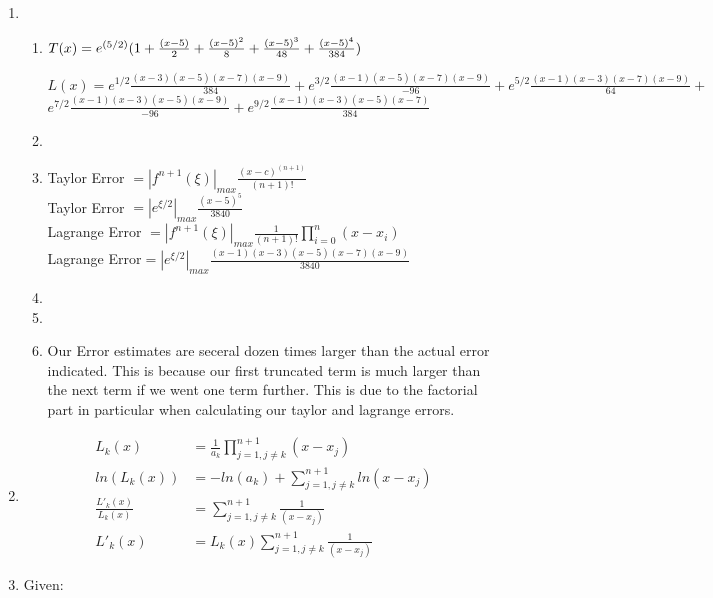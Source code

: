 \documentclass{article}
\begin{document}

\begin{enumerate}

\item \begin{enumerate}
\item 
$
T(x)=e^{(5/2)}(1+\frac{(x-5)}{2}+\frac{(x-5)^2}{8}+\frac{(x-5)^3}{48}+\frac{(x-5)^4}{384}) \\
$


$ L(x)=e^{1/2}\frac{(x-3)(x-5)(x-7)(x-9)}{384}+ e^{3/2}\frac{(x-1)(x-5)(x-7)(x-9)}{-96}+e^{5/2}\frac{(x-1)(x-3)(x-7)(x-9)}{64}+$\\$ e^{7/2}\frac{(x-1)(x-3)(x-5)(x-9)}{-96}+ e^{9/2}\frac{(x-1)(x-3)(x-5)(x-7)}{384}$

\item 
\item Taylor Error $=\left| f^{n+1}(\xi) \right|_{max} \frac{(x-c)^{(n+1)}}{(n+1)!}$ \\
Taylor Error $=\left| e^{\xi/2} \right|_{max} \frac{(x-5)^5}{3840}$ \\
Lagrange Error $\displaystyle = \left| f^{n+1}(\xi)\right |_{max} \frac{1}{(n+1)!} \prod_{i=0}^{n} (x-x_{i})$\\
Lagrange Error$=\left| e^{\xi/2} \right|_{max} \frac{(x-1)(x-3)(x-5)(x-7)(x-9)}{3840}$ 
\item 
\item
\item Our Error estimates are seceral dozen times larger than the actual error indicated. This is because our first truncated term is much larger than the next term if we went one term further. This is due to the factorial part in particular when calculating our taylor and lagrange errors. 
\end{enumerate}
\item 
\begin{equation*}
\begin{split}
\displaystyle L_{k}(x) & =\frac{1}{a_{k}} \prod_{j=1, j\neq k}^{n+1} (x-x_{j}) \\
ln(L_{k}(x)) & =-ln(a_{k})+ \sum_{j=1, j \neq k}^{n+1}ln(x-x_{j}) \\
\frac{L'_{k}(x)}{L_{k}(x)} &= \sum_{j=1, j \neq k}^{n+1} \frac{1}{(x-x_{j})} \\
L'_{k}(x) &= L_{k}(x)\sum_{j=1, j \neq k}^{n+1} \frac{1}{(x-x_{j})}
\end{split}
\end{equation*}
\item Given:

\end{enumerate}
\end{document}
